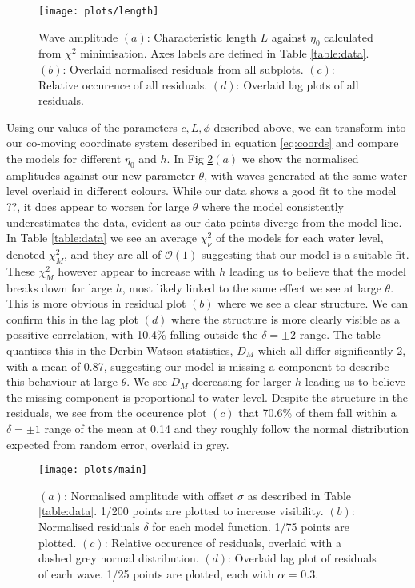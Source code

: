 \documentclass[10pt, twocolumn]{revtex4}    %
\begin{document}
\begin{figure}[!h]
  \texttt{[image: plots/length]}
  \caption{Wave amplitude
  $(a)$: Characteristic length $L$ against $\eta_0$ calculated from $\chi^2$ minimisation. Axes labels are defined in Table \ref{table:data}.
  $(b)$: Overlaid normalised residuals from all subplots.
  $(c)$: Relative occurence of all residuals.
  $(d)$: Overlaid lag plots of all residuals.
  }
  \label{plot:L}
\end{figure}

Using our values of the parameters $c, L, \phi$ described above, we can transform into our co-moving coordinate system described in equation \ref{eq:coords} and compare the models for different $\eta_0$ and $h$.
In Fig \ref{plot:model}$(a)$ we show the normalised amplitudes against our new parameter $\theta$, with waves generated at the same water level overlaid in different colours.
While our data shows a good fit to the model ??, it does appear to worsen for large $\theta$ where the model consistently underestimates the data, evident as our data points diverge from the model line.
In Table \ref{table:data} we see an average $\chi^2_\nu$ of the models for each water level, denoted $\chi^2_M$, and they are all of $\mathcal{O}(1)$ suggesting that our model is a suitable fit.
These $\chi^2_M$ however appear to increase with $h$ leading us to believe that the model breaks down for large $h$, most likely linked to the same effect we see at large $\theta$.
This is more obvious in residual plot $(b)$ where we see a clear structure.
We can confirm this in the lag plot $(d)$ where the structure is more clearly visible as a possitive correlation, with 10.4\% falling outside the $\delta = \pm 2$ range.
The table quantises this in the Derbin-Watson statistics, $D_M$ which all differ significantly 2, with a mean of 0.87, suggesting our model is missing a component to describe this behaviour at large $\theta$.
We see $D_M$ decreasing for larger $h$ leading us to believe the missing component is proportional to water level.
Despite the structure in the residuals, we see from the occurence plot $(c)$ that 70.6\% of them fall within a $\delta = \pm 1$ range of the mean at 0.14 and they roughly follow the normal distribution expected from random error, overlaid in grey.

\begin{figure}[!h]
  \texttt{[image: plots/main]}
  \caption{
  $(a)$: Normalised amplitude with offset $\sigma$ as described in Table \ref{table:data}. 1/200 points are plotted to increase visibility.
  $(b)$: Normalised residuals $\delta$ for each model function. 1/75 points are plotted.
  $(c)$: Relative occurence of residuals, overlaid with a dashed grey normal distribution.
  $(d)$: Overlaid lag plot of residuals of each wave. 1/25 points are plotted, each with $\alpha$ = 0.3.
  }
  \label{plot:model}
\end{figure}
\end{document}
